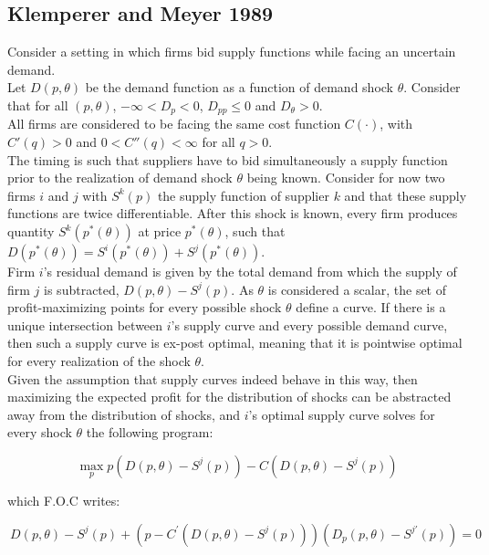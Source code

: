 \subsection*{Klemperer and Meyer 1989}
Consider a setting in which firms bid supply functions while facing an uncertain demand. \\

Let $D(p,\theta)$ be the demand function as a function of demand shock $\theta$. Consider that for all $(p,\theta)$, $-\infty<D_p<0$, $D_{pp}\leq 0$ and $D_\theta>0$.\\

All firms are considered to be facing the same cost function $C(\cdot)$, with $C'(q)>0$ and $0<C''(q)<\infty$ for all $q>0$.\\

The timing is such that suppliers have to bid simultaneously a supply function prior to the realization of demand shock $\theta$ being known. Consider for now two firms $i$ and $j$ with $S^k(p)$ the supply function of supplier $k$ and that these supply functions are twice differentiable. After this shock is known, every firm produces quantity $S^k(p^*(\theta))$ at price $p^*(\theta)$, such that $D(p^*(\theta)) = S^i(p^*(\theta)) + S^j(p^*(\theta))$.\\

Firm $i$'s residual demand is given by the total demand from which the supply of firm $j$ is subtracted, $D(p,\theta) - S^j(p)$. As $\theta$ is considered a scalar, the set of profit-maximizing points for every possible shock $\theta$ define a curve. If there is a unique intersection between $i$'s supply curve and every possible demand curve, then such a supply curve is ex-post optimal, meaning that it is pointwise optimal for every realization of the shock $\theta$. \\

Given the assumption that supply curves indeed behave in this way, then maximizing the expected profit for the distribution of shocks can be abstracted away from the distribution of shocks, and $i$'s optimal supply curve solves for every shock $\theta$ the following program:

\begin{equation}\label{maxKM}
\max_p p\left( D(p,\theta) - S^j(p)\right) - C\left( D(p,\theta) - S^j(p)\right) 
\end{equation}

which F.O.C writes:

\begin{equation}\label{KMfoc}
\ D(p,\theta) - S^j(p) + \left( p - C^\prime\left( D(p,\theta) - S^j(p)\right)    \right)\left(  D_p(p,\theta)   - S^{j\prime}(p)\right) = 0
\end{equation}

